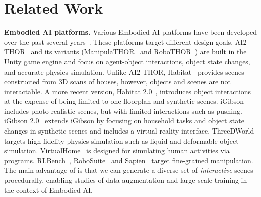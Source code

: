 \section{Related Work}
\label{sec:relatedwork}

\noindent \textbf{Embodied AI platforms.} Various Embodied AI platforms have been developed over the past several years~\cite{kolve2017ai2,savva2019habitat,Shen2020iGibsonAS,xiang2020sapien,Gan2020ThreeDWorldAP,house3d}. These platforms target different design goals. AI2-THOR~\cite{kolve2017ai2} and its variants (ManipulaTHOR~\cite{manipulathor} and RoboTHOR~\cite{Deitke2020RoboTHORAO}) are built in the Unity game engine and focus on agent-object interactions, object state changes, and accurate physics simulation. Unlike AI2-THOR, Habitat~\cite{savva2019habitat} provides scenes constructed from 3D scans of houses, however, objects and scenes are not interactable. A more recent version, Habitat 2.0~\cite{szot2021habitat}, introduces object interactions at the expense of being limited to one floorplan and synthetic scenes. iGibson~\cite{Shen2020iGibsonAS} includes photo-realistic scenes, but with limited interactions such as pushing. iGibson 2.0~\cite{Li2021iGibson2O} extends iGibson by focusing on household tasks and object state changes in synthetic scenes and includes a virtual reality interface. ThreeDWorld~\cite{Gan2020ThreeDWorldAP} targets high-fidelity physics simulation such as liquid and deformable object simulation. VirtualHome~\cite{Puig2018VirtualHomeSH} is designed for simulating human activities via programs. RLBench~\cite{james2020rlbench}, RoboSuite~\cite{zhu2020robosuite} and Sapien~\cite{xiang2020sapien} target fine-grained manipulation. The main advantage of \env is that we can generate a diverse set of \emph{interactive} scenes procedurally, enabling studies of data augmentation and large-scale training in the context of Embodied AI. 
 
